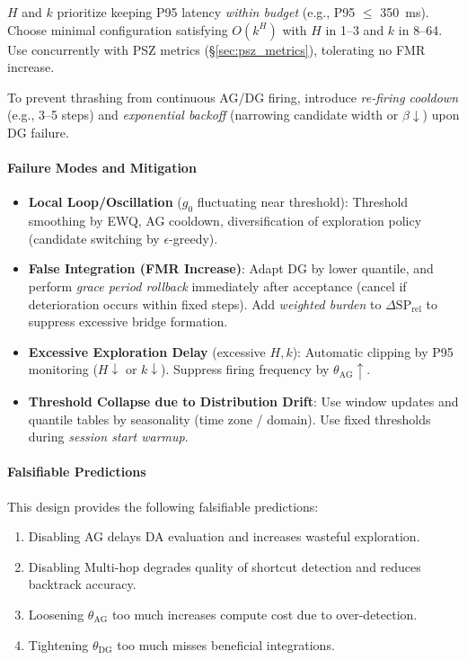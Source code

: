 \documentclass[12pt]{article}
\begin{document}
\begin{description}[leftmargin=1.6em]
  \item[Alignment with Compute Budget] \; $H$ and $k$ prioritize keeping P95 latency \emph{within budget} (e.g., P95 $\le$ \SI{350}{ms}). Choose minimal configuration satisfying $O(k^H)$ with $H$ in 1--3 and $k$ in 8--64. Use concurrently with PSZ metrics (\S\ref{sec:psz_metrics}), tolerating no FMR increase.
  \item[Cooldown and Backoff] \; To prevent thrashing from continuous AG/DG firing, introduce \emph{re-firing cooldown} (e.g., 3--5 steps) and \emph{exponential backoff} (narrowing candidate width or $\beta\downarrow$) upon DG failure.
\end{description}

\paragraph{Failure Modes and Mitigation}\label{sec:failure_modes}
\begin{itemize}[leftmargin=*]
  \item \textbf{Local Loop/Oscillation} ($g_0$ fluctuating near threshold): Threshold smoothing by EWQ, AG cooldown, diversification of exploration policy (candidate switching by $\epsilon$-greedy).
  \item \textbf{False Integration (FMR Increase)}: Adapt DG by lower quantile, and perform \emph{grace period rollback} immediately after acceptance (cancel if deterioration occurs within fixed steps). Add \emph{weighted burden} to $\Delta\mathrm{SP}_{\mathrm{rel}}$ to suppress excessive bridge formation.
  \item \textbf{Excessive Exploration Delay} (excessive $H, k$): Automatic clipping by P95 monitoring ($H\downarrow$ or $k\downarrow$). Suppress firing frequency by $\theta_{\mathrm{AG}}\uparrow$.
  \item \textbf{Threshold Collapse due to Distribution Drift}: Use window updates and quantile tables by seasonality (time zone / domain). Use fixed thresholds during \emph{session start warmup}.
\end{itemize}

\paragraph{Falsifiable Predictions}
This design provides the following falsifiable predictions:
\begin{enumerate}
  \item Disabling AG delays DA evaluation and increases wasteful exploration.
  \item Disabling Multi-hop degrades quality of shortcut detection and reduces backtrack accuracy.
  \item Loosening $\theta_{\mathrm{AG}}$ too much increases compute cost due to over-detection.
  \item Tightening $\theta_{\mathrm{DG}}$ too much misses beneficial integrations.
\end{enumerate}
\end{document}
